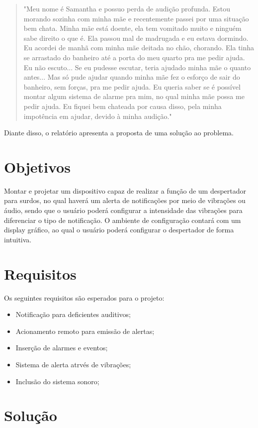 \documentclass[conference]{IEEEtran}
\begin{document}
\begin{quote}
"Meu nome é Samantha e possuo perda de audição profunda. Estou morando sozinha com minha mãe e recentemente passei por uma situação bem chata. Minha mãe está doente, ela tem vomitado muito e ninguém sabe direito o que é. Ela passou mal de madrugada e eu estava dormindo. Eu acordei de manhã com minha mãe deitada no chão, chorando. Ela tinha se arrastado do banheiro até a porta do meu quarto pra me pedir ajuda. Eu não escuto... Se eu pudesse escutar, teria ajudado minha mãe o quanto antes... Mas só pude ajudar quando minha mãe fez o esforço de sair do banheiro, sem forças, pra me pedir ajuda. Eu queria saber se é possível montar algum sistema de alarme pra mim, no qual minha mãe possa me pedir ajuda. Eu fiquei bem chateada por causa disso, pela minha impotência em ajudar, devido à minha audição."
\end{quote}

Diante disso, o relatório apresenta a proposta de uma solução ao problema.

\section{Objetivos}
Montar e projetar um dispositivo capaz de realizar a função de um despertador para surdos, no qual haverá um alerta de notificações por meio de vibrações ou áudio, sendo que o usuário poderá configurar a intensidade das vibrações para diferenciar o tipo de notificação. O ambiente de configuração contará com um display gráfico, ao qual o usuário poderá configurar o despertador de forma intuitiva.

\section{Requisitos}

Os seguintes requisitos são esperados para o projeto:
\begin{itemize}
	\item Notificação para deficientes auditivos;
    \item Acionamento remoto para emissão de alertas;
    \item Inserção de alarmes e eventos;
    \item Sistema de alerta atrvés de vibrações;
    \item Inclusão do sistema sonoro;

\end{itemize}

\section{Solução}
\end{document}
